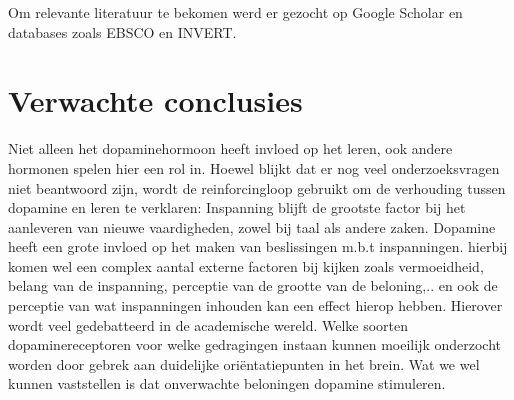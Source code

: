 \documentclass{hogent-article}
\begin{document}
Om relevante literatuur te bekomen werd er gezocht op Google Scholar en databases zoals EBSCO en INVERT.

\section{Verwachte conclusies}


Niet alleen het dopaminehormoon heeft invloed op het leren, ook andere hormonen spelen hier een rol in. Hoewel blijkt dat er nog veel onderzoeksvragen niet beantwoord zijn, wordt de reinforcingloop gebruikt om de verhouding tussen dopamine en leren te verklaren:
Inspanning blijft de grootste factor bij het aanleveren van nieuwe vaardigheden, zowel bij taal als andere zaken. Dopamine heeft een grote invloed op het maken van beslissingen m.b.t inspanningen. hierbij komen wel een complex aantal externe factoren bij kijken zoals vermoeidheid, belang van de inspanning, perceptie van de grootte van de beloning,.. en ook de perceptie van wat inspanningen inhouden kan een effect hierop hebben. Hierover wordt veel gedebatteerd in de academische wereld. Welke soorten dopaminereceptoren voor welke gedragingen instaan kunnen moeilijk onderzocht worden door gebrek aan duidelijke oriëntatiepunten in het brein. Wat we wel kunnen vaststellen is dat onverwachte beloningen dopamine stimuleren.



\printbibliography[heading=bibintoc]
\end{document}
